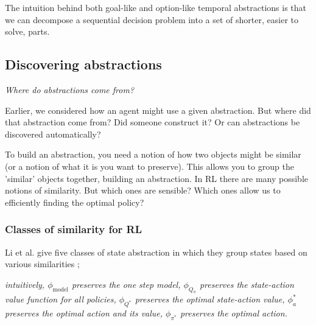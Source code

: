 The intuition behind both goal-like and option-like temporal abstractions is that
we can decompose a sequential decision problem into a set of shorter, easier to solve, parts.

\subsection{Discovering abstractions}

\begin{displayquote}
  \textit{Where do abstractions come from?}
\end{displayquote}

Earlier, we considered how an agent might use a given abstraction.
But where did that abstraction come from? Did someone construct it?
Or can abstractions be discovered automatically?

To build an abstraction, you need a notion of how two objects might be
similar (or a notion of what it is you want to preserve).
This allows you to group the 'similar' objects together, building an abstraction.
In RL there are many possible notions of similarity. But which ones are sensible?
Which ones allow us to efficiently finding the optimal policy?

\vspace{5mm}

\subsubsection{Classes of similarity for RL}\label{similar-classes}

Li et al. \cite{Littman2006} give five classes of state abstraction in which they group states based on various similarities \footnotemark[20];

\textit{intuitively,
$\phi_{\text{model}}$ preserves the one step model,
$\phi_{Q_{\pi}}$ preserves the state-action value function for all policies,
$\phi_{Q^{* }}$ preserves the optimal state-action value,
$\phi_a^{* }$ preserves the optimal action and its value,
$\phi_{\pi^{* }}$ preserves the optimal action.}

\vspace{5mm}

